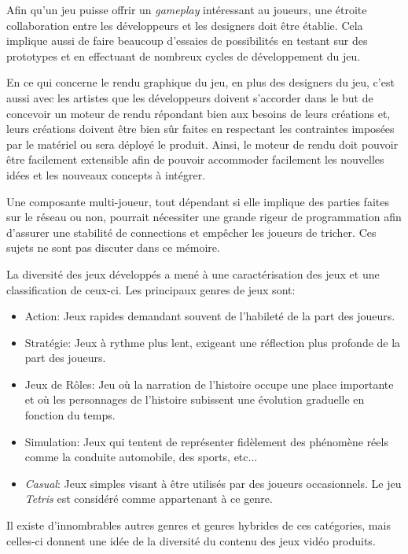 \documentclass[12pt,oneside,letterpaper,francais]{book}
\begin{document}
Afin qu'un jeu puisse offrir un \textit{gameplay} intéressant au
joueurs, une étroite collaboration entre les développeurs et les
designers doit être établie. Cela implique aussi de faire beaucoup
d'essaies de possibilités en testant sur des prototypes et en
effectuant de nombreux cycles de développement du jeu.

En ce qui concerne le rendu graphique du jeu, en plus des designers du
jeu, c'est aussi avec les artistes que les développeurs doivent
s'accorder dans le but de concevoir un moteur de rendu répondant bien
aux besoins de leurs créations et, leurs créations doivent être bien
sûr faites en respectant les contraintes imposées par le matériel ou
sera déployé le produit. Ainsi, le moteur de rendu doit pouvoir être
facilement extensible afin de pouvoir accommoder facilement les
nouvelles idées et les nouveaux concepts à intégrer.

Une composante multi-joueur, tout dépendant si elle implique des
parties faites sur le réseau ou non, pourrait nécessiter une grande
rigeur de programmation afin d'assurer une stabilité de connections et
empêcher les joueurs de tricher. Ces sujets ne sont pas discuter dans
ce mémoire.

La diversité des jeux développés a mené à une caractérisation des jeux
et une classification de ceux-ci. Les principaux genres de jeux sont:

\begin{itemize}
\item Action: Jeux rapides demandant souvent de l'habileté de la part
  des joueurs.
\item Stratégie: Jeux à rythme plus lent, exigeant une réflection plus
  profonde de la part des joueurs.
\item Jeux de Rôles: Jeu où la narration de l'histoire occupe une
  place importante et où les personnages de l'histoire subissent une
  évolution graduelle en fonction du temps.
\item Simulation: Jeux qui tentent de représenter fidèlement des
  phénomène réels comme la conduite automobile, des sports, etc...
\item \textit{Casual}: Jeux simples visant à être utilisés par des
  joueurs occasionnels. Le jeu \textit{Tetris} est considéré comme
  appartenant à ce genre.
\end{itemize}

Il existe d'innombrables autres genres et genres hybrides de ces
catégories, mais celles-ci donnent une idée de la diversité du contenu
des jeux vidéo produits.
\end{document}
